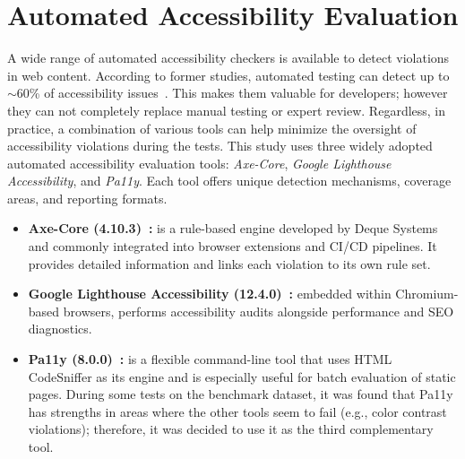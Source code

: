 \section{Automated Accessibility Evaluation}
A wide range of automated accessibility checkers is available to 
detect violations in web content.
According to former studies, automated testing can detect up to $\sim$60\% 
of accessibility issues~\cite{deque2023accessibility}. This makes them 
valuable for developers; however they can not completely replace manual testing or 
expert review.
Regardless, in practice, a combination of various tools can help minimize the 
oversight of accessibility violations during the tests.\newline
This study uses three widely adopted automated accessibility evaluation 
tools: \textit{Axe-Core}, \textit{Google Lighthouse Accessibility},
and \textit{Pa11y}. Each tool offers unique detection mechanisms,
coverage areas, and reporting formats.
\begin{itemize}
  \item \textbf{Axe-Core (4.10.3)~\cite{web:axecore}:} is a rule-based engine
  developed by Deque Systems and commonly integrated into browser 
  extensions and CI/CD pipelines. It provides detailed information
  and links each violation to its own rule set.
  \item \textbf{Google Lighthouse Accessibility (12.4.0)~\cite{web:lighthouse}:} 
  embedded within Chromium-based browsers, performs accessibility audits
  alongside performance and SEO diagnostics.
  \item \textbf{Pa11y (8.0.0)~\cite{web:pa11y}:} is a flexible command-line tool 
  that uses HTML CodeSniffer as its engine and is especially useful for batch 
  evaluation of static pages. During some tests on the benchmark dataset, 
  it was found that Pa11y has strengths in areas where the other 
  tools seem to fail (e.g., color contrast violations); therefore, it was 
  decided to use it as the third complementary tool.
\end{itemize}
 
